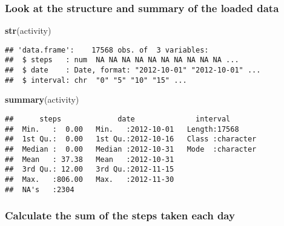 \documentclass[]{article}
\newenvironment{Shaded}{\begin{snugshade}}{\end{snugshade}}
\newcommand{\DataTypeTok}[1]{\textcolor[rgb]{0.13,0.29,0.53}{#1}}
\newcommand{\KeywordTok}[1]{\textcolor[rgb]{0.13,0.29,0.53}{\textbf{#1}}}
\newcommand{\NormalTok}[1]{#1}
\newcommand{\OperatorTok}[1]{\textcolor[rgb]{0.81,0.36,0.00}{\textbf{#1}}}
\newcommand{\StringTok}[1]{\textcolor[rgb]{0.31,0.60,0.02}{#1}}
\begin{document}
\hypertarget{look-at-the-structure-and-summary-of-the-loaded-data}{%
\subsubsection{Look at the structure and summary of the loaded
data}\label{look-at-the-structure-and-summary-of-the-loaded-data}}

\begin{Shaded}
\begin{Highlighting}[]
\KeywordTok{str}\NormalTok{(activity)}
\end{Highlighting}
\end{Shaded}

\begin{verbatim}
## 'data.frame':    17568 obs. of  3 variables:
##  $ steps   : num  NA NA NA NA NA NA NA NA NA NA ...
##  $ date    : Date, format: "2012-10-01" "2012-10-01" ...
##  $ interval: chr  "0" "5" "10" "15" ...
\end{verbatim}

\begin{Shaded}
\begin{Highlighting}[]
\KeywordTok{summary}\NormalTok{(activity)}
\end{Highlighting}
\end{Shaded}

\begin{verbatim}
##      steps             date              interval        
##  Min.   :  0.00   Min.   :2012-10-01   Length:17568      
##  1st Qu.:  0.00   1st Qu.:2012-10-16   Class :character  
##  Median :  0.00   Median :2012-10-31   Mode  :character  
##  Mean   : 37.38   Mean   :2012-10-31                     
##  3rd Qu.: 12.00   3rd Qu.:2012-11-15                     
##  Max.   :806.00   Max.   :2012-11-30                     
##  NA's   :2304
\end{verbatim}

\hypertarget{calculate-the-sum-of-the-steps-taken-each-day}{%
\subsubsection{Calculate the sum of the steps taken each
day}\label{calculate-the-sum-of-the-steps-taken-each-day}}

\begin{Shaded}
\end{Shaded}
\end{document}
